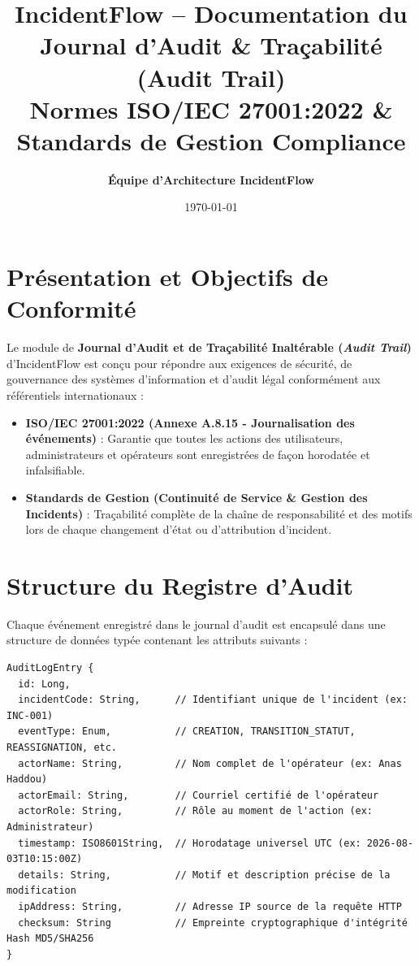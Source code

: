 \documentclass[11pt,a4paper]{article}
\title{\textbf{\Large IncidentFlow -- Documentation du Journal d'Audit \& Traçabilité (Audit Trail)}\\\large Normes ISO/IEC 27001:2022 \& Standards de Gestion Compliance}
\author{\textbf{Équipe d'Architecture IncidentFlow}}
\date{\today}
\begin{document}
\maketitle

\section{Présentation et Objectifs de Conformité}

Le module de \textbf{Journal d'Audit et de Traçabilité Inaltérable (\textit{Audit Trail})} d'IncidentFlow est conçu pour répondre aux exigences de sécurité, de gouvernance des systèmes d'information et d'audit légal conformément aux référentiels internationaux :
\begin{itemize}
    \item \textbf{ISO/IEC 27001:2022 (Annexe A.8.15 - Journalisation des événements)} : Garantie que toutes les actions des utilisateurs, administrateurs et opérateurs sont enregistrées de façon horodatée et infalsifiable.
    \item \textbf{Standards de Gestion (Continuité de Service \& Gestion des Incidents)} : Traçabilité complète de la chaîne de responsabilité et des motifs lors de chaque changement d'état ou d'attribution d'incident.
\end{itemize}

\section{Structure du Registre d'Audit}

Chaque événement enregistré dans le journal d'audit est encapsulé dans une structure de données typée contenant les attributs suivants :

\begin{verbatim}
AuditLogEntry {
  id: Long,
  incidentCode: String,      // Identifiant unique de l'incident (ex: INC-001)
  eventType: Enum,           // CREATION, TRANSITION_STATUT, REASSIGNATION, etc.
  actorName: String,         // Nom complet de l'opérateur (ex: Anas Haddou)
  actorEmail: String,        // Courriel certifié de l'opérateur
  actorRole: String,         // Rôle au moment de l'action (ex: Administrateur)
  timestamp: ISO8601String,  // Horodatage universel UTC (ex: 2026-08-03T10:15:00Z)
  details: String,           // Motif et description précise de la modification
  ipAddress: String,         // Adresse IP source de la requête HTTP
  checksum: String           // Empreinte cryptographique d'intégrité Hash MD5/SHA256
}
\end{verbatim}
\end{document}
